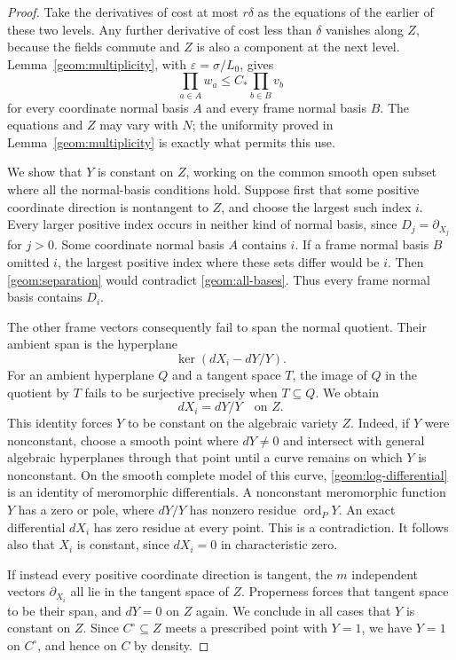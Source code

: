 \begin{proof}
Take the derivatives of cost at most $r\delta$ as the equations of the
earlier of these two levels. Any further derivative of cost less than
$\delta$ vanishes along $Z$, because the fields commute and $Z$ is
also a component at the next level. Lemma~\ref{geom:multiplicity}, with
$\varepsilon=\sigma/L_0$, gives
\begin{equation}
\label{geom:all-bases}
 \prod_{a\in A}w_a\le C_*\prod_{b\in B}v_b
\end{equation}
for every coordinate normal basis $A$ and every frame normal basis $B$.
The equations and $Z$ may vary with $N$; the uniformity proved in
Lemma~\ref{geom:multiplicity} is exactly what permits this use.

We show that $Y$ is constant on $Z$, working on the common smooth open
subset where all the normal-basis conditions hold. Suppose first that
some positive coordinate direction is nontangent to $Z$, and choose the
largest such index $i$. Every larger positive index occurs in neither
kind of normal basis, since $D_j=\partial_{X_j}$ for $j>0$.
Some coordinate normal basis $A$ contains $i$. If a frame normal basis
$B$ omitted $i$, the largest positive index where these sets differ
would be $i$. Then
\eqref{geom:separation} would contradict \eqref{geom:all-bases}.
Thus every frame normal basis contains $D_i$.

The other frame vectors consequently fail to span the normal quotient.
Their ambient span is the hyperplane
\[
 \ker(dX_i-dY/Y).
\]
For an ambient hyperplane $Q$ and a tangent space $T$, the image of
$Q$ in the quotient by $T$ fails to be surjective precisely when
$T\subseteq Q$. We obtain
\begin{equation}
\label{geom:log-differential}
 dX_i=dY/Y\quad\text{on }Z.
\end{equation}
This identity forces $Y$ to be constant on the algebraic variety $Z$.
Indeed, if $Y$ were nonconstant, choose a smooth point where $dY\ne0$
and intersect with general algebraic hyperplanes through that point
until a curve remains on which $Y$ is nonconstant. On the smooth
complete model of this curve, \eqref{geom:log-differential} is an
identity of meromorphic differentials. A nonconstant meromorphic
function $Y$ has a zero or pole, where $dY/Y$ has nonzero residue
$\operatorname{ord}_P Y$. An exact differential $dX_i$ has zero
residue at every point. This is a contradiction. It follows also
that $X_i$ is constant, since $dX_i=0$ in characteristic zero.

If instead every positive coordinate direction is tangent, the $m$
independent vectors $\partial_{X_i}$ all lie in the tangent space of
$Z$. Properness forces that tangent space to be their span, and
$dY=0$ on $Z$ again. We conclude in all cases that $Y$ is constant
on $Z$. Since $C^\circ\subseteq Z$ meets a prescribed point with
$Y=1$, we have $Y=1$ on $C^\circ$, and hence on $C$ by density.


\end{proof}
